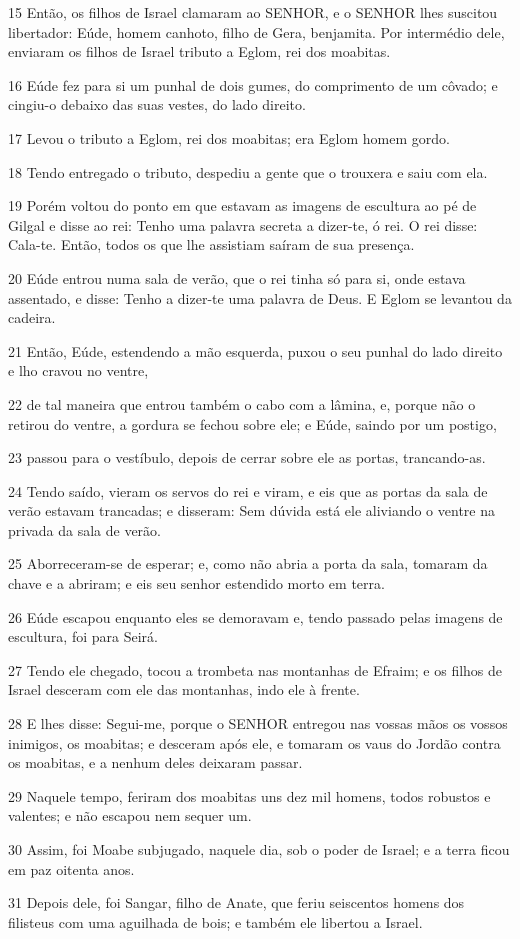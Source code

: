\par 15 Então, os filhos de Israel clamaram ao SENHOR, e o SENHOR lhes suscitou libertador: Eúde, homem canhoto, filho de Gera, benjamita. Por intermédio dele, enviaram os filhos de Israel tributo a Eglom, rei dos moabitas.
\par 16 Eúde fez para si um punhal de dois gumes, do comprimento de um côvado; e cingiu-o debaixo das suas vestes, do lado direito.
\par 17 Levou o tributo a Eglom, rei dos moabitas; era Eglom homem gordo.
\par 18 Tendo entregado o tributo, despediu a gente que o trouxera e saiu com ela.
\par 19 Porém voltou do ponto em que estavam as imagens de escultura ao pé de Gilgal e disse ao rei: Tenho uma palavra secreta a dizer-te, ó rei. O rei disse: Cala-te. Então, todos os que lhe assistiam saíram de sua presença.
\par 20 Eúde entrou numa sala de verão, que o rei tinha só para si, onde estava assentado, e disse: Tenho a dizer-te uma palavra de Deus. E Eglom se levantou da cadeira.
\par 21 Então, Eúde, estendendo a mão esquerda, puxou o seu punhal do lado direito e lho cravou no ventre,
\par 22 de tal maneira que entrou também o cabo com a lâmina, e, porque não o retirou do ventre, a gordura se fechou sobre ele; e Eúde, saindo por um postigo,
\par 23 passou para o vestíbulo, depois de cerrar sobre ele as portas, trancando-as.
\par 24 Tendo saído, vieram os servos do rei e viram, e eis que as portas da sala de verão estavam trancadas; e disseram: Sem dúvida está ele aliviando o ventre na privada da sala de verão.
\par 25 Aborreceram-se de esperar; e, como não abria a porta da sala, tomaram da chave e a abriram; e eis seu senhor estendido morto em terra.
\par 26 Eúde escapou enquanto eles se demoravam e, tendo passado pelas imagens de escultura, foi para Seirá.
\par 27 Tendo ele chegado, tocou a trombeta nas montanhas de Efraim; e os filhos de Israel desceram com ele das montanhas, indo ele à frente.
\par 28 E lhes disse: Segui-me, porque o SENHOR entregou nas vossas mãos os vossos inimigos, os moabitas; e desceram após ele, e tomaram os vaus do Jordão contra os moabitas, e a nenhum deles deixaram passar.
\par 29 Naquele tempo, feriram dos moabitas uns dez mil homens, todos robustos e valentes; e não escapou nem sequer um.
\par 30 Assim, foi Moabe subjugado, naquele dia, sob o poder de Israel; e a terra ficou em paz oitenta anos.
\par 31 Depois dele, foi Sangar, filho de Anate, que feriu seiscentos homens dos filisteus com uma aguilhada de bois; e também ele libertou a Israel.

